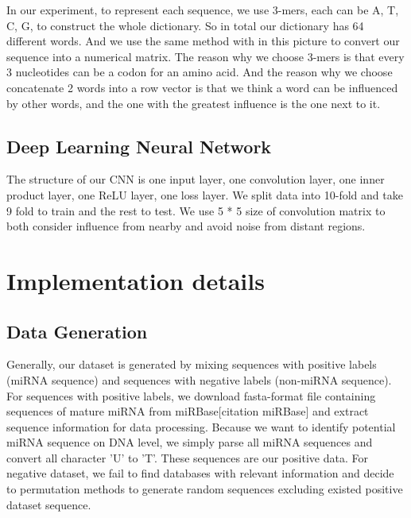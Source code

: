 \documentclass[letterpaper, 11pt]{article}
\begin{document}
\begin{multicols*}{2}
{In our experiment, to represent each sequence, we use 3-mers, each can be A, T, C, G, to construct the whole dictionary. So in total our dictionary has 64 different words. And we use the same method with in this picture to convert our sequence into a numerical matrix. The reason why we choose 3-mers is that every 3 nucleotides can be a codon for an amino acid. And the reason why we 	choose concatenate 2 words into a row vector is that we think a word can be influenced by other words, and the one with the greatest influence is the one next to it.

\subsection{Deep Learning Neural Network}
The structure of our CNN is one input layer, one convolution layer, one inner product layer, one ReLU layer, one loss layer. We split data into 10-fold and take 9 fold to train and the rest to test. We use 5 * 5 size of convolution matrix to both consider influence from nearby and avoid noise from distant regions. 
}

\section{Implementation details}
{
\subsection{Data Generation}
\indent Generally, our dataset is generated by mixing sequences with positive labels (miRNA sequence) and sequences with negative labels (non-miRNA sequence). For sequences with positive labels, we download fasta-format file containing sequences of mature miRNA from miRBase[citation miRBase] and extract sequence information for data processing. Because we want to identify potential miRNA sequence on DNA level, we simply parse all miRNA sequences and convert all character 'U' to 'T'. These sequences are our positive data. For negative dataset, we fail to find databases with relevant information and decide to permutation methods to generate random sequences excluding existed positive dataset sequence.

}
\end{multicols*}
\end{document}
